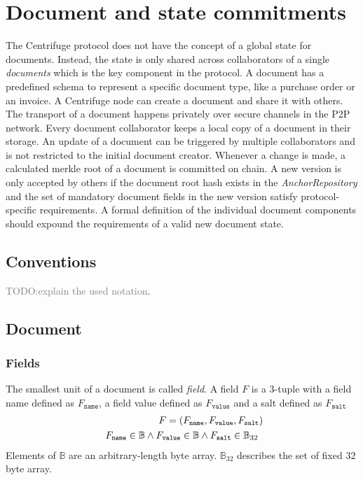 \section{Document and state commitments}\label{sec:doc_state_comm}

The Centrifuge protocol does not have the concept of a global state for documents. Instead, the state is only shared across collaborators of a single \textit{documents} which is the key component in the protocol.
A document has a predefined schema to represent a specific document type, like a purchase order or an invoice. A Centrifuge node can create a document and share it with others. The transport of a document happens privately over secure channels in the P2P network. Every document collaborator keeps a local copy of a document in their storage. An update of a document can be triggered by multiple collaborators and is not restricted to the initial document creator. Whenever a change is made, a
calculated merkle root of a document is committed on chain. A new version is only accepted by others if the document root hash exists in the \textit{AnchorRepository} and the set of mandatory document fields in the new version satisfy protocol-specific requirements.  A formal definition of the individual document components should expound the requirements of a valid new document state. 
\newline
\subsection{Conventions}
\textcolor{gray}{TODO:explain the used notation}.
\subsection{Document}
\subsubsection{Fields}
The smallest unit of a document is called \textit{field}.  
A field $F$ is a 3-tuple  with a field name defined as $F_\texttt{name}$, a field value defined as $F_\texttt{value}$ and a salt defined as $F_\texttt{salt}$
\begin{eqnarray}
F = (F_\texttt{name},F_\texttt{value},F_\texttt{salt}) \\
\begin{array}[t]{lclclc}
F_{\texttt{name}} \in \mathbb{B} \wedge F_{\texttt{value}} \in \mathbb{B} \wedge  F_{\texttt{salt}} \in \mathbb{B}_{32} \\
\end{array}
\end{eqnarray}
Elements of $\mathbb{B}$ are an arbitrary-length byte array. $\mathbb{B}_{32}$ describes the set of fixed 32 byte array. 


